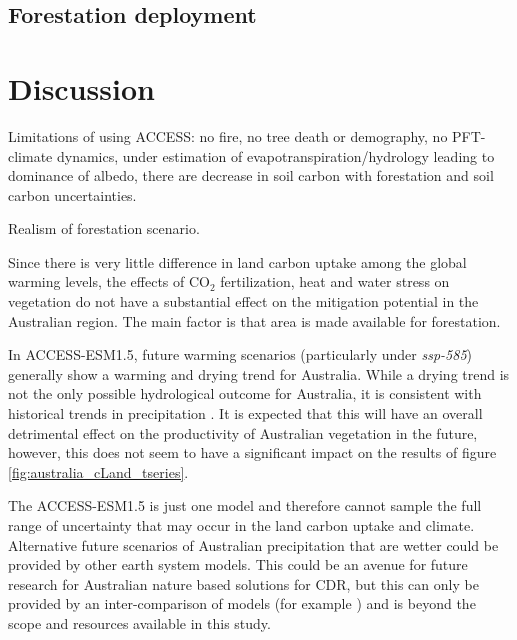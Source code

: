\documentclass[]{article}
\begin{document}
\subsection{Forestation deployment}


\section{Discussion}

Limitations of using ACCESS: no fire, no tree death or demography, no PFT-climate dynamics, under estimation of evapotranspiration/hydrology leading to dominance of albedo, there are decrease in soil carbon with forestation and soil carbon uncertainties.

Realism of forestation scenario.

Since there is very little difference in land carbon uptake among the global warming levels, the effects of CO$_2$ fertilization, heat and water stress on vegetation do not have a substantial effect on the mitigation potential in the Australian region.
The main factor is that area is made available for forestation.

In ACCESS-ESM1.5, future warming scenarios (particularly under \textit{ssp-585}) generally show a warming and drying trend for Australia.
While a drying trend is not the only possible hydrological outcome for Australia, it is consistent with historical trends in precipitation \parencite{ziehn_australian_2020}.
It is expected that this will have an overall detrimental effect on the productivity of Australian vegetation in the future, however, this does not seem to have a significant impact on the results of figure \ref{fig:australia_cLand_tseries}.

The ACCESS-ESM1.5 is just one model and therefore cannot sample the full range of uncertainty that may occur in the land carbon uptake and climate.
Alternative future scenarios of Australian precipitation that are wetter could be provided by other earth system models.
This could be an avenue for future research for Australian nature based solutions for CDR, but this can only be provided by an inter-comparison of models (for example \cite{loughran_limited_2023}) and is beyond the scope and resources available in this study.
\end{document}
